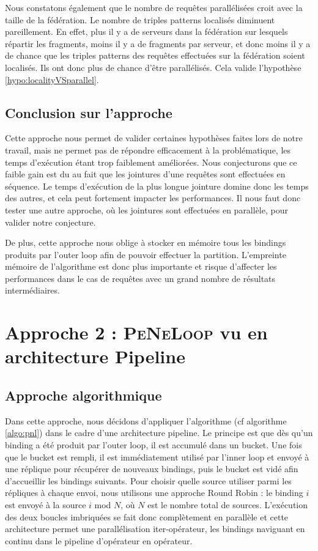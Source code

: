 \documentclass[a4paper]{article}
\def\peneloop{\textsc{PeNeLoop}\xspace}
\begin{document}
Nous constatons également que le nombre de requêtes parallélisées croit avec la taille de la fédération. Le nombre de triples patterns localisés diminuent pareillement. En effet, plus il y a de serveurs dans la fédération sur lesquels répartir les fragments, moins il y a de fragments par serveur, et donc moins il y a de chance que les triples patterns des requêtes effectuées sur la fédération soient localisés. Ils ont donc plus de chance d'être parallélisés. Cela valide l'hypothèse \ref{hypo:localityVSparallel}.

\subsection{Conclusion sur l'approche}

Cette approche nous permet de valider certaines hypothèses faites lors de notre travail, mais ne permet pas de répondre efficacement à la problématique, les temps d'exécution étant trop faiblement améliorées. Nous conjecturons que ce faible gain est du au fait que les jointures d'une requêtes sont effectuées en séquence. Le temps d'exécution de la plus longue jointure domine donc les temps des autres, et cela peut fortement impacter les performances. Il nous faut donc tester une autre approche, où les jointures sont effectuées en parallèle, pour valider notre conjecture.

De plus, cette approche nous oblige à stocker en mémoire tous les bindings produits par l'outer loop afin de pouvoir effectuer la partition. L'empreinte mémoire de l'algorithme est donc plus importante et risque d'affecter les performances dans le cas de requêtes avec un grand nombre de résultats intermédiaires.

\section{Approche 2 : \peneloop vu en architecture Pipeline}

\subsection{Approche algorithmique}

Dans cette approche, nous décidons d'appliquer l'algorithme (cf algorithme \ref{algo:pnl}) dans le cadre d'une architecture pipeline. Le principe est que dès qu'un binding a été produit par l'outer loop, il est accumulé dans un bucket. Une fois que le bucket est rempli, il est immédiatement utilisé par l'inner loop et envoyé à une réplique pour récupérer de nouveaux bindings, puis le bucket est vidé afin d'accueillir les bindings suivants. Pour choisir quelle source utiliser parmi les répliques à chaque envoi, nous utilisons une approche Round Robin : le binding $i$ est envoyé à la source $i$ mod $N$, où $N$ est le nombre total de sources. L'exécution des deux boucles imbriquées se fait donc complètement en parallèle et cette architecture permet une parallélisation iter-opérateur, les bindings naviguant en continu dans le pipeline d'opérateur en opérateur.
\end{document}

